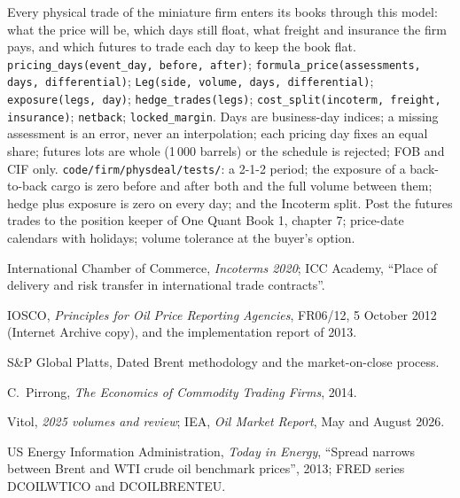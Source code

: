 \begin{build}
 Every physical trade of the miniature firm enters its books through
this model: what the price will be, which days still float, what freight and
insurance the firm pays, and which futures to trade each day to keep the book flat.
 \texttt{pricing\_days(event\_day, before, after)};
\texttt{formula\_price(assessments, days, differential)}; \texttt{Leg(side, volume,
days, differential)}; \texttt{exposure(legs, day)}; \texttt{hedge\_trades(legs)};
\texttt{cost\_split(incoterm, freight, insurance)}; \texttt{netback};
\texttt{locked\_margin}.
 Days are business-day indices; a missing assessment is an error, never
an interpolation; each pricing day fixes an equal share; futures lots are whole
(1\,000 barrels) or the schedule is rejected; FOB and CIF only.
 \texttt{code/firm/physdeal/tests/}: a 2-1-2 period; the
exposure of a back-to-back cargo is zero before and after both  and
the full volume between them; hedge plus exposure is zero on every day;  and
the Incoterm split.
 Post the futures trades to the position keeper of One Quant Book 1,
chapter 7; price-date calendars with holidays; volume tolerance at the buyer's
option.
\end{build}

\begin{omsources}
\item International Chamber of Commerce, \emph{Incoterms 2020}; ICC Academy, ``Place
of delivery and risk transfer in international trade contracts''.
\item IOSCO, \emph{Principles for Oil Price Reporting Agencies}, FR06/12, 5 October 2012
(Internet Archive copy), and the implementation report of 2013.
\item S\&P Global Platts, Dated Brent methodology and the market-on-close process.
\item C.~Pirrong, \emph{The Economics of Commodity Trading Firms}, 2014.
\item Vitol, \emph{2025 volumes and review}; IEA, \emph{Oil Market Report}, May and
August 2026.
\item US Energy Information Administration, \emph{Today in Energy}, ``Spread narrows
between Brent and WTI crude oil benchmark prices'', 2013; FRED series DCOILWTICO and
DCOILBRENTEU.
\end{omsources}

